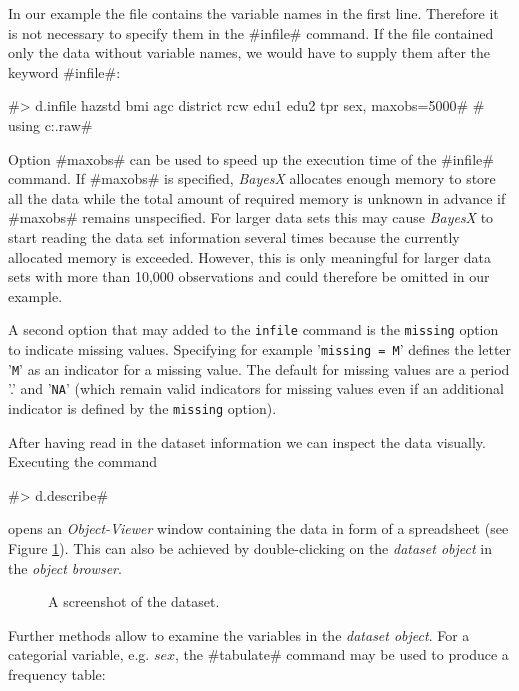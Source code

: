 \documentclass{article}
\begin{document}
In our example the file contains the variable names in the first
line. Therefore  it is not necessary to specify them in the
#infile# command. If the file contained only the data without
variable names, we would have to supply them after the keyword
#infile#:

 #> d.infile hazstd bmi agc district rcw edu1 edu2 tpr sex, maxobs=5000#
 #  using c:\data\zambia.raw#


Option #maxobs# can be used to speed up the execution time of the
#infile# command. If #maxobs# is specified, {\it BayesX} allocates
enough memory to store all the data while the total amount of
required memory is unknown in advance if #maxobs# remains
unspecified. For larger data sets this may cause {\it BayesX} to
start reading the data set information several times because the
currently allocated memory is exceeded. However, this is only
meaningful for larger data sets with more than 10,000 observations
and could therefore be omitted in our example.

A second option that may added to the {\tt infile} command is the
{\tt missing} option to indicate missing values. Specifying for
example '{\tt missing = M}' defines the letter '{\tt M}' as an
indicator for a missing value. The default for missing values are
a period '.' and '{\tt NA}' (which remain valid indicators for
missing values even if an additional indicator is defined by the
{\tt missing} option).

After having read in the dataset information we can inspect the
data visually. Executing the command

#> d.describe#

opens an {\it Object-Viewer} window containing the data in form of
a spreadsheet (see Figure \ref{screenshot}). This can also be
achieved by double-clicking on the {\it dataset object} in the
{\it object browser}.

\vspace{1cm}

\begin{figure}[ht]
\begin{center}
 {\it\caption{A
screenshot of the dataset.\label{screenshot}}}
\end{center}
\end{figure}

Further methods allow to examine the variables in the {\it dataset
object}. For a categorial variable, e.g. $sex$, the #tabulate#
command may be used to produce a frequency table:
\end{document}

